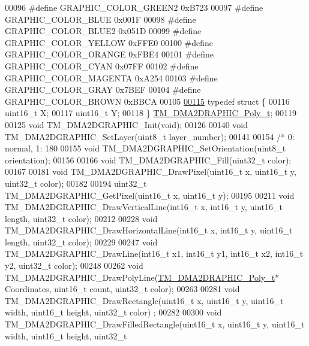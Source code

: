 \begin{DoxyCode}
00096 \textcolor{preprocessor}{#define GRAPHIC\_COLOR\_GREEN2        0xB723}
00097 \textcolor{preprocessor}{#define GRAPHIC\_COLOR\_BLUE          0x001F}
00098 \textcolor{preprocessor}{#define GRAPHIC\_COLOR\_BLUE2         0x051D}
00099 \textcolor{preprocessor}{#define GRAPHIC\_COLOR\_YELLOW        0xFFE0}
00100 \textcolor{preprocessor}{#define GRAPHIC\_COLOR\_ORANGE        0xFBE4}
00101 \textcolor{preprocessor}{#define GRAPHIC\_COLOR\_CYAN          0x07FF}
00102 \textcolor{preprocessor}{#define GRAPHIC\_COLOR\_MAGENTA       0xA254}
00103 \textcolor{preprocessor}{#define GRAPHIC\_COLOR\_GRAY          0x7BEF}
00104 \textcolor{preprocessor}{#define GRAPHIC\_COLOR\_BROWN         0xBBCA}
00105 
\hypertarget{tm__stm32f4__dma2d__graphic_8h_source_l00115}{}\hyperlink{struct_t_m___d_m_a2_d_r_a_p_h_i_c___poly__t}{00115} \textcolor{keyword}{typedef} \textcolor{keyword}{struct }\{
00116     uint16\_t X;
00117     uint16\_t Y;
00118 \} \hyperlink{struct_t_m___d_m_a2_d_r_a_p_h_i_c___poly__t}{TM\_DMA2DRAPHIC\_Poly\_t};
00119 
00125 \textcolor{keywordtype}{void} TM\_DMA2DGRAPHIC\_Init(\textcolor{keywordtype}{void});
00126 
00140 \textcolor{keywordtype}{void} TM\_DMA2DGRAPHIC\_SetLayer(uint8\_t layer\_number);
00141 
00154 \textcolor{comment}{/* 0: normal, 1: 180%
00155 \textcolor{keywordtype}{void} TM\_DMA2DGRAPHIC\_SetOrientation(uint8\_t orientation);
00156 
00166 \textcolor{keywordtype}{void} TM\_DMA2DGRAPHIC\_Fill(uint32\_t color);
00167 
00181 \textcolor{keywordtype}{void} TM\_DMA2DGRAPHIC\_DrawPixel(uint16\_t x, uint16\_t y, uint32\_t color);
00182 
00194 uint32\_t TM\_DMA2DGRAPHIC\_GetPixel(uint16\_t x, uint16\_t y);
00195 
00211 \textcolor{keywordtype}{void} TM\_DMA2DGRAPHIC\_DrawVerticalLine(int16\_t x, int16\_t y, uint16\_t length, uint32\_t color);
00212 
00228 \textcolor{keywordtype}{void} TM\_DMA2DGRAPHIC\_DrawHorizontalLine(int16\_t x, int16\_t y, uint16\_t length, uint32\_t color);
00229 
00247 \textcolor{keywordtype}{void} TM\_DMA2DGRAPHIC\_DrawLine(int16\_t x1, int16\_t y1, int16\_t x2, int16\_t y2, uint32\_t color);
00248 
00262 \textcolor{keywordtype}{void} TM\_DMA2DGRAPHIC\_DrawPolyLine(\hyperlink{struct_t_m___d_m_a2_d_r_a_p_h_i_c___poly__t}{TM\_DMA2DRAPHIC\_Poly\_t}* Coordinates, uint16\_t count, 
      uint32\_t color);
00263 
00281 \textcolor{keywordtype}{void} TM\_DMA2DGRAPHIC\_DrawRectangle(uint16\_t x, uint16\_t y, uint16\_t width, uint16\_t height, uint32\_t color)
      ;
00282 
00300 \textcolor{keywordtype}{void} TM\_DMA2DGRAPHIC\_DrawFilledRectangle(uint16\_t x, uint16\_t y, uint16\_t width, uint16\_t height, uint32\_t 
}
\end{DoxyCode}
